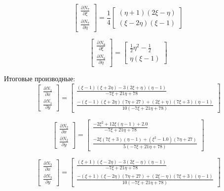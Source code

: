 \documentclass[a4paper, 12pt]{article}
\begin{document}
\begin{enumerate}
\begin{enumerate}
			\[
				\begin{bmatrix}
				\frac{\partial N_7}{\partial \xi} \\ 
				\frac{\partial N_7}{\partial \eta}
				\end{bmatrix}
				=
				\frac{1}{4}
				\begin{bmatrix}
				(\eta + 1)(2\xi - \eta) \\ 
				(\xi - 2\eta)(\xi - 1)
				\end{bmatrix}
			\]

			\[
				\begin{bmatrix}
				\frac{\partial N_8}{\partial \xi} \\ 
				\frac{\partial N_8}{\partial \eta}
				\end{bmatrix}
				=
				\begin{bmatrix}
				\frac{1}{2}\eta^2 - \frac{1}{2} \\ 
				\eta(\xi - 1)
				\end{bmatrix}
			\]

			Итоговые производные:
			\[
				\begin{bmatrix}
				\frac{\partial N_1}{\partial x} \\ 
				\frac{\partial N_1}{\partial y}
				\end{bmatrix}
				=
				\left[\begin{matrix}\frac{\left(\xi - 1\right) \left(\xi + 2\eta\right) - 3 \left(2\xi +\eta\right) \left(\eta - 1\right)}{- 7\xi + 21\eta + 78}\\\frac{- \left(\xi - 1\right) \left(\xi + 2\eta\right) \left(7\eta + 27\right) + \left(2\xi +\eta\right) \left(7\xi + 3\right) \left(\eta - 1\right)}{10 \left(- 7\xi + 21\eta + 78\right)}\end{matrix}\right]
			\]

			\[
				\begin{bmatrix}
				\frac{\partial N_2}{\partial x} \\ 
				\frac{\partial N_2}{\partial y}
				\end{bmatrix}
				=
				\left[\begin{matrix}\frac{- 2\xi^{2} + 12\xi \left(\eta - 1\right) + 2.0}{- 7\xi + 21\eta + 78}\\\frac{- 2\xi \left(7\xi + 3\right) \left(\eta - 1\right) + \left(\xi^{2} - 1.0\right) \left(7\eta + 27\right)}{5 \left(- 7\xi + 21\eta + 78\right)}\end{matrix}\right]
			\]

			\[
				\begin{bmatrix}
				\frac{\partial N_3}{\partial x} \\ 
				\frac{\partial N_3}{\partial y}
				\end{bmatrix}
				=
				\left[\begin{matrix}\frac{\left(\xi + 1\right) \left(\xi - 2\eta\right) - 3 \left(2\xi -\eta\right) \left(\eta - 1\right)}{- 7\xi + 21\eta + 78}\\\frac{- \left(\xi + 1\right) \left(\xi - 2\eta\right) \left(7\eta + 27\right) + \left(2\xi -\eta\right) \left(7\xi + 3\right) \left(\eta - 1\right)}{10 \left(- 7\xi + 21\eta + 78\right)}\end{matrix}\right]
			\]


\end{enumerate}
\end{enumerate}
\end{document}
